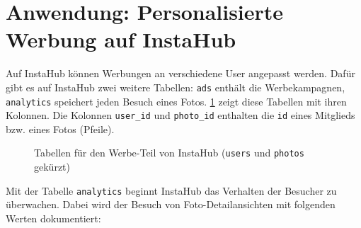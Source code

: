 \section{Anwendung: Personalisierte Werbung auf InstaHub}

Auf InstaHub können Werbungen an verschiedene User angepasst werden. Dafür gibt es auf InstaHub zwei weitere Tabellen: \texttt{ads} enthält die Werbekampagnen, \texttt{analytics} speichert jeden Besuch eines Fotos. \cref{fig:tabellen-werbung} zeigt diese Tabellen mit ihren Kolonnen. Die Kolonnen \texttt{user\_id} und \texttt{photo\_id} enthalten die \texttt{id} eines Mitglieds bzw. eines Fotos (Pfeile).

\begin{figure}[H]
  \centering
  
  \caption{Tabellen für den Werbe-Teil von InstaHub (\texttt{users} und \texttt{photos} gekürzt)}
  \label{fig:tabellen-werbung}
\end{figure}

Mit der Tabelle \texttt{analytics} beginnt InstaHub das Verhalten der Besucher zu überwachen. Dabei wird der Besuch von Foto-Detailansichten mit folgenden Werten dokumentiert:

